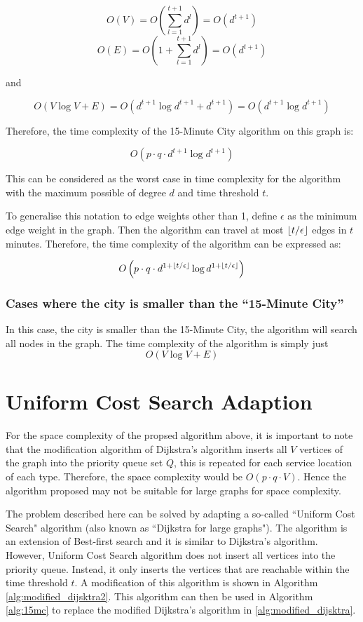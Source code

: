 $$O(V)=O(\sum_{l=1}^{t+1} d^l)=O(d^{t+1})$$
$$O(E)=O(1+\sum_{l=1}^{t+1} d^l)=O(d^{t+1})$$

and

$$O(V\log V+E)=O(d^{t+1}\log d^{t+1}+d^{t+1})=O(d^{t+1}\log d^{t+1})$$

Therefore, the time complexity of the 15-Minute City algorithm on this graph is:

$$O\left(p\cdot q\cdot d^{t+1}\log d^{t+1}\right)$$

This can be considered as the worst case in time complexity for the algorithm with the maximum possible of degree $d$ and time threshold $t$.

To generalise this notation to edge weights other than 1, define $\epsilon$ as the minimum edge weight in the graph. Then the algorithm can travel at most $\floor*{t/\epsilon}$ edges in $t$ minutes. Therefore, the time complexity of the algorithm can be expressed as:

$$O\left(p\cdot q\cdot d^{1+\floor*{t/\epsilon}}\log d^{1+\floor*{t/\epsilon}}\right)$$

\subsubsection{Cases where the city is smaller than the ``15-Minute City''}

In this case, the city is smaller than the 15-Minute City, the algorithm will search all nodes in the graph. The time complexity of the algorithm is simply just $$O(V\log V+E)$$

\section{Uniform Cost Search Adaption}

For the space complexity of the propsed algorithm above, it is important to note that the modification algorithm of Dijkstra's algorithm inserts all $V$ vertices of the graph into the priority queue set $Q$, this is repeated for each service location of each type. Therefore, the space complexity would be $O(p\cdot q\cdot V)$. Hence the algorithm proposed may not be suitable for large graphs for space complexity.

The problem described here can be solved by adapting a so-called ``Uniform Cost Search" algorithm (also known as ``Dijkstra for large graphs"). The algorithm is an extension of Best-first search and it is similar to Dijkstra's algorithm. However, Uniform Cost Search algorithm does not insert all vertices into the priority queue. Instead, it only inserts the vertices that are reachable within the time threshold $t$. A modification of this algorithm is shown in Algorithm \ref{alg:modified_dijsktra2}. This algorithm can then be used in Algorithm \ref{alg:15mc} to replace the modified Dijkstra's algorithm in \ref{alg:modified_dijsktra}.

